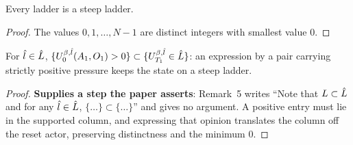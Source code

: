 \begin{remark}[$\ladder \subset \steep$]
  \label{rem5}
  \leanok
  Every ladder is a steep ladder.
\end{remark}
\begin{proof}
  \leanok
  The values $0, 1, \dots, N-1$ are distinct integers with smallest value $0$.
\end{proof}

\begin{lemma}
  \label{rem5-stable}
  \leanok
  For $\hat{l} \in \hat{L}$,
  $\{ U^{\beta,\hat{l}}_0(A_1,O_1) > 0 \} \subset \{ U^{\beta,\hat{l}}_{T_1} \in \hat{L} \}$:
  an expression by a pair carrying strictly positive pressure keeps the state on
  a steep ladder.
\end{lemma}
\begin{proof}
  \leanok
  \textbf{Supplies a step the paper asserts}: Remark~5 writes
  ``Note that $\ladder \subset \steep$ and for any $\hat{l} \in \hat{L}$,
  $\{\dots\} \subset \{\dots\}$'' and gives no argument.
  A positive entry must lie in the supported column, and expressing that opinion
  translates the column off the reset actor, preserving distinctness and the
  minimum $0$.
\end{proof}

